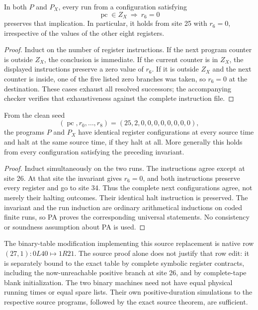 \begin{lemma}
In both $P$ and $P_X$, every run from a configuration satisfying
\[
                    \operatorname{pc}\in Z_X\ \Longrightarrow\ r_6=0
\]
preserves that implication. In particular, it holds from site 25 with
$r_6=0$, irrespective of the values of the other eight registers.
\end{lemma}
\begin{proof}
Induct on the number of register instructions. If the next program counter
is outside $Z_X$, the conclusion is immediate. If the current counter is
in $Z_X$, the displayed instructions preserve a zero value of $r_6$.
If it is outside $Z_X$ and the next counter is inside, one of the five
listed zero branches was taken, so $r_6=0$ at the destination. These cases
exhaust all resolved successors; the accompanying checker verifies that
exhaustiveness against the complete instruction file.
\end{proof}

\begin{theorem}
From the clean seed
\[
       (\operatorname{pc},r_0,\ldots,r_8)
                  =(25,2,0,0,0,0,0,0,0,0),
\]
the programs $P$ and $P_X$ have identical register configurations at every
source time and halt at the same source time, if they halt at all. More
generally this holds from every configuration satisfying the preceding
invariant.
\end{theorem}
\begin{proof}
Induct simultaneously on the two runs. The instructions agree except at
site 26. At that site the invariant gives $r_6=0$, and both instructions
preserve every register and go to site 34. Thus the complete next
configurations agree, not merely their halting outcomes. Their identical
halt instruction is preserved. The invariant and the run induction are
ordinary arithmetical inductions on coded finite runs, so PA proves the
corresponding universal statements. No consistency or soundness assumption
about PA is used.
\end{proof}

The binary-table modification implementing this source replacement is
native row $(27,1):0L40\mapsto1R21$. The source proof alone does not justify
that row edit: it is separately bound to the exact table by complete
symbolic register contracts, including the now-unreachable positive
branch at site 26, and by complete-tape blank initialization. The two
binary machines need not have equal physical running times or equal
spare lists. Their own positive-duration simulations to the respective
source programs, followed by the exact source theorem, are sufficient.

